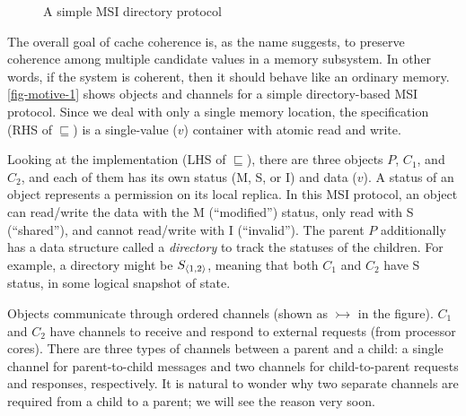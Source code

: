 \documentclass[sigplan,10pt,review,anonymous,screen]{acmart}\settopmatter{printfolios=true,printccs=false,printacmref=false}
\begin{document}
\begin{figure}[h]
  \caption{A simple MSI directory protocol}
  \vspace{-5pt}
  \label{fig-motive-1}
\end{figure}

The overall goal of cache coherence is, as the name suggests, to preserve coherence among multiple candidate values in a memory subsystem.
In other words, if the system is coherent, then it should behave like an ordinary memory.
\autoref{fig-motive-1} shows objects and channels for a simple directory-based MSI protocol.
Since we deal with only a single memory location, the specification (RHS of $\sqsubseteq$) is a single-value ($v$) container with atomic read and write.

Looking at the implementation (LHS of $\sqsubseteq$), there are three objects $P$, $C_1$, and $C_2$, and each of them has its own status (M, S, or I) and data ($v$).
A status of an object represents a permission on its local replica.
In this MSI protocol, an object can read/write the data with the M (``modified'') status, only read with S (``shared''), and cannot read/write with I (``invalid'').
The parent $P$ additionally has a data structure called a \emph{directory} to track the statuses of the children.
For example, a directory might be $S_{\langle 1, 2 \rangle}$, meaning that both $C_1$ and $C_2$ have S status, in some logical snapshot of state.

Objects communicate through ordered channels (shown as $\rightarrowtail$ in the figure).
$C_1$ and $C_2$ have channels to receive and respond to external requests (from processor cores).
There are three types of channels between a parent and a child: a single channel for parent-to-child messages and two channels for child-to-parent requests and responses, respectively.
It is natural to wonder why two separate channels are required from a child to a parent; we will see the reason very soon.

\newcommand{\blackdiamond}{\raisebox{.4ex}{\ensuremath{\scriptscriptstyle\blacklozenge}}}
\end{document}
